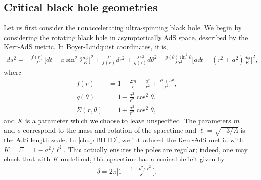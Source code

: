 \documentclass[
twoside,
openright,
frontopenright,
]{dmathesis}
\newcommand{\nn}{\nonumber}
\begin{document}

\subsection{Critical black hole geometries}

Let us first consider the nonaccelerating ultra-spinning black hole. We begin by
considering the rotating black hole in asymptotically AdS space, described by
the Kerr-AdS metric. In Boyer-Lindquist coordinates, it is,
\begin{align} \label{eq:kerrAdS}
ds^2 = -\frac{f(r)}{\Sigma}\Big[dt-a\sin^2\theta \frac{d\phi}{K} \Big]^2 +
  \frac{\Sigma}{f(r)}dr^2 + \frac{\Sigma r^2}{g(\theta)}d\theta^2 +
  \frac{g(\theta) \sin^2\theta}{\Sigma r^2} \Big[adt-(r^2+a^2)
  \frac{d\phi}{K}\Big]^2, 
\end{align}
where
\begin{align}
f(r)&= 1-\frac{2 m}{r}+\frac{a^2}{r^2}+\frac{r^2+a^2}{\ell^2},\nn\\
g(\theta)&=1 - \frac{a^2}{\ell^2} \cos^2\theta, \nn\\
\Sigma(r, \theta) &= 1 + \frac{a^2}{r^2} \cos^2\theta,
\end{align}
and $K$ is a parameter which we choose to leave unspecified. The parameters $m$
and $a$ correspond to the mass and rotation of the spacetime and
$\ell = \sqrt{-3/\Lambda}$ is the AdS length scale. In \cref{chap:BHTD}, we
introduced the Kerr-AdS metric with $K = \Xi = 1-a^2/\ell^2$. This actually ensures
the poles are regular; indeed, one may check that with $K$ undefined, this
spacetime has a conical deficit given by
\begin{align}\label{eq:deficit-al}
\delta = 2\pi \bigg[1-\frac{1-a^{2}/\ell^{2}}{K}\bigg].
\end{align}
\end{document}
